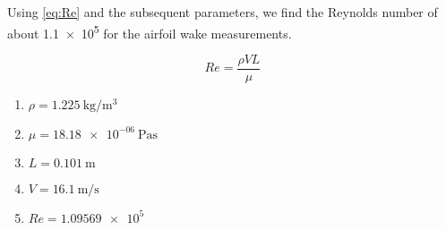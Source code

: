 \newpage

Using \autoref{eq:Re} and the subsequent parameters, we find the Reynolds number of about \num{1.1e5} for the airfoil wake measurements.

\begin{equation}\label{eq:Re}
    Re = \frac{\rho V L}{\mu}
\end{equation}

\begin{enumerate}
    \item[] $\rho = \qty{1.225}{\kilogram\per\meter^3}$
    \item[] $\mu = \qty{18.18e-06}{\pascal\second}$
    \item[] $L = \qty{0.101}{\meter}$
    \item[] $V = \qty{16.1}{\meter\per\second}$
    \item[] $Re = \num{1.09569e5}$
\end{enumerate}